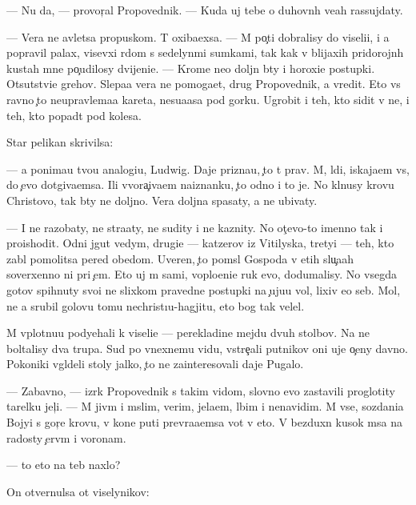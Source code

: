 \documentclass[10pt]{book}
\begin{document}
— Nu da, — provor{\c}al Propovednik. — Kuda uj tebe o duhovn{\yi}h ve{\x}ah rassujdaty.

— Vera ne {\y}avl{\ia}{\y}etsa propuskom. T{\yi} oxiba{\y}exsa. — M{\yi} po{\c}ti dobralisy do viseli{\q}i, i {\y}a popravil palax, visevxi{\y} r{\ia}dom s sedelyn{\yi}mi sumkami, tak kak v blija{\y}xih pridorojn{\yi}h kustah mne po{\c}udilosy dvijeni{\y}e. — Krome ne{\y}o doljn{\yi} b{\yi}ty i horoxi{\y}e postupki. Otsutstvi{\y}e grehov. Slepa{\y}a vera ne pomoga{\y}et, drug Propovednik, a vredit. Eto vs{\e} ravno {\c}to neupravl{\ia}{\y}ema{\y}a kareta, nesu{\x}a{\y}asa pod gorku. Ugrobit i teh, kto sidit v ne{\y}, i teh, kto popad{\e}t pod kolesa.

Star{\yi}{\y} pelikan skrivilsa:

— {\Y}a ponima{\y}u tvo{\y}u analogi{\y}u, Ludwig. Daje prizna{\y}u, {\c}to t{\yi} prav. M{\yi}, l{\iu}di, iskaja{\y}em vs{\e}, do {\c}evo dot{\ia}giva{\y}emsa. Ili v{\yi}vora{\c}iva{\y}em naiznanku, {\c}to odno i to je. No kl{\ia}nusy krov{\y}u Christovo{\y}, tak b{\yi}ty ne doljno. Vera doljna spasaty, a ne ubivaty.

— I ne razob{\x}aty, ne stra{\x}aty, ne sudity i ne kaznity. No ot{\c}evo-to imenno tak i proishodit. Odni jgut vedym, drugi{\y}e — katzerov iz Vitilyska, tretyi — teh, kto zab{\yi}l pomolitsa pered obedom. Uveren, {\c}to pom{\yi}sl{\yi} Gospoda v etih slu{\c}a{\y}ah soverxenno ni pri {\c}em. Eto uj m{\yi} sami, voplo{\x}eni{\y}e ruk {\y}evo, dodumalisy. No vsegda gotov{\yi} spihnuty svo{\y}i ne slixkom pravedn{\yi}{\y}e postupki na {\c}uju{\y}u vol{\iu}, lixiv {\y}e{\y}o seb{\ia}. Mol, ne {\y}a srubil golovu tomu nechrist{\i}u-hagjitu, eto bog tak velel.

M{\yi} vplotnu{\y}u podyehali k viseli{\q}e — perekladine mejdu dvuh stolbov. Na ne{\y} boltalisy dva trupa. Sud{\ia} po vnexnemu vidu, vstre{\c}ali putnikov oni uje o{\c}eny davno. Poko{\y}niki v{\yi}gl{\ia}deli stoly jalko, {\c}to ne zainteresovali daje Pugalo.

— Zabavno, — izr{\e}k Propovednik s takim vidom, slovno {\y}evo zastavili proglotity tarelku jel{\c}i. — M{\yi} jiv{\e}m i m{\yi}slim, verim, jela{\y}em, l{\iu}bim i nenavidim. M{\yi} vse, sozdani{\y}a Bojyi s gor{\ia}{\c}e{\y} krov{\y}u, v kon{\q}e puti prevra{\x}a{\y}emsa vot v eto. V bezduxn{\yi}{\y} kusok m{\ia}sa na radosty {\c}erv{\ia}m i voronam.

— {\C}to eto na teb{\ia} naxlo?

On otvernulsa ot viselynikov:
\end{document}
